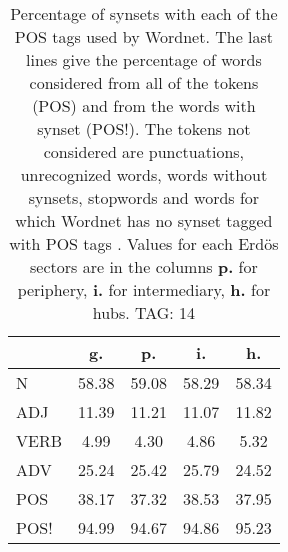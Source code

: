 \begin{table}[h!]
\begin{center}
\begin{tabular}{| l || c | c | c | c |}\hline
 & {\bf g.} & {\bf p.} & {\bf i.} & {\bf h.} \\\hline\hline
N & 58.38  & 59.08  & 58.29  & 58.34 \\\hline
ADJ & 11.39  & 11.21  & 11.07  & 11.82 \\\hline
VERB & 4.99  & 4.30  & 4.86  & 5.32 \\\hline
ADV & 25.24  & 25.42  & 25.79  & 24.52 \\\hline\hline
POS & 38.17  & 37.32  & 38.53  & 37.95 \\\hline
POS! & 94.99  & 94.67  & 94.86  & 95.23 \\\hline
\end{tabular}
\caption{Percentage of synsets with each of the POS tags used by Wordnet. The last lines give the percentage of words considered from all of the tokens (POS) and from the words with synset (POS!). The tokens not considered are punctuations, unrecognized words, words without synsets, stopwords and words for which Wordnet has no synset  tagged with POS tags . Values for each Erd\"os sectors are in the columns {{\bf p.}} for periphery, {{\bf i.}} for intermediary, {{\bf h.}} for hubs. TAG: 14}
\end{center}
\end{table}